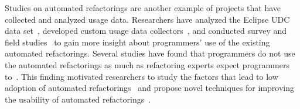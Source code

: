 Studies on automated refactorings are another example of projects that have
collected and analyzed usage data. Researchers have analyzed the Eclipse UDC
data set~\cite{V:MurphyHill2012How, VakilianETAL2013Compositional}, developed
custom usage data collectors~\cite{VakilianETAL2012UseDisuseMisuse}, and
conducted survey and field studies~\cite{V:MurphyHill2012How,
VakilianJohnson2014Alternate, NegaraETAL2013ManualRefactorings} to gain more
insight about programmers' use of the existing automated refactorings. Several
studies have found that programmers do not use the automated refactorings as
much as refactoring experts expect programmers to~\cite{V:MurphyHill2012How,
NegaraETAL2013ManualRefactorings}. This finding motivated researchers to study
the factors that lead to low adoption of automated
refactorings~\cite{VakilianETAL2012UseDisuseMisuse, V:MurphyHill2012How} and
propose novel techniques for improving the usability of automated
refactorings~\cite{V:MurphyHill2012How, MurphyHill2012Improving,
MurphyHill2008ExtractMethod, LeeETAL2013DragDrop, MurphyHillETAL2011Gestures,
GeETAL2012BeneFactor, FosterETAL2012WitchDoctor}.
%
%

